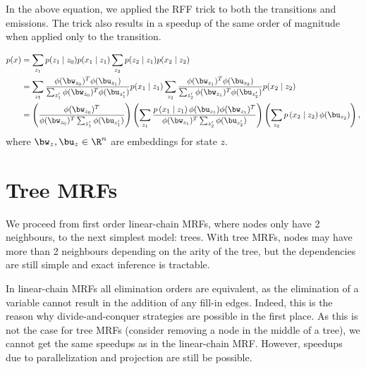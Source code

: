 \documentclass{article}
\begin{document}
In the above equation, we applied the RFF trick to both the transitions and emissions.
The trick also results in a speedup of the same order of magnitude when
applied only to the transition.

\begin{equation}
\begin{aligned}
p(x)
&= \sum_{z_1} p(z_1 \mid z_0)p(x_1 \mid z_1)  \sum_{z_2} p(z_2 \mid z_1)p(x_2 \mid z_2)\\
&= \sum_{z_1} \frac{\phi(\bw_{z_0})^T\phi(\bu_{z_1})}{\sum_{z_1'}\phi(\bw_{z_0})^T\phi(\bu_{z'_1})}
p(x_1 \mid z_1)
\sum_{z_2} \frac{\phi(\bw_{z_1})^T\phi(\bu_{z_2})}{\sum_{z_2'}\phi(\bw_{z_1})^T\phi(\bu_{z_2'})}
p(x_2 \mid z_2)\\
&= \left(\frac{\phi(\bw_{z_0})^T}{\phi(\bw_{z_0})^T\sum_{z_1'}\phi(\bu_{z'_1})}\right)
\left(
\sum_{z_1} 
\frac{p\left(x_1 \mid z_1\right)\phi(\bu_{z_1})\phi(\bw_{z_1})^T}
{
    \phi(\bw_{z_1})^T\sum_{z_2'}\phi(\bu_{z_2'})
}
\right)
\left(
\sum_{z_2} 
p\left(x_2 \mid z_2\right)\phi(\bu_{z_2})
\right),
\end{aligned}
\end{equation}
where $\bw_z,\bu_z\in\R^n$ are embeddings for state $z$.

\section{Tree MRFs}
We proceed from first order linear-chain MRFs, where nodes only have 2 neighbours,
to the next simplest model: trees.
With tree MRFs, nodes may have more than 2 neighbours depending on the arity of the tree,
but the dependencies are still simple and exact inference is tractable.

In linear-chain MRFs all elimination orders are equivalent, as the elimination 
of a variable cannot result in the addition of any fill-in edges.
Indeed, this is the reason why divide-and-conquer strategies are possible
in the first place.
As this is not the case for tree MRFs (consider removing a node in the middle of a tree),
we cannot get the same speedups as in the linear-chain MRF.
However, speedups due to parallelization and projection are still be possible.
\end{document}
